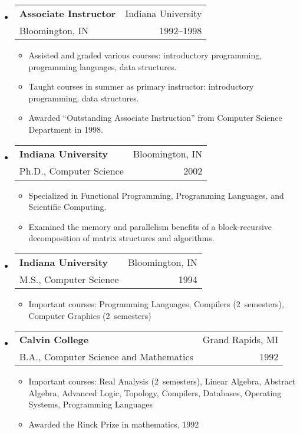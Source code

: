 \documentclass[letterpaper,10pt]{article}
\makeatletter
\newcommand{\resitem}[1]{\item #1 \vspace{-2pt}}
\newcommand{\resheading}[1]{{\large \parashade[.9]{sharpcorners}{\textbf{#1 \vphantom{p\^{E}}}}}}
\newcommand{\ressubheading}[4]{ 
\begin{tabular*}{7in}{l@{\extracolsep{\fill}}r}
	\textbf{#1} & #2 \\
	{#3} & {#4} \\
\end{tabular*}
\vspace{-6pt}}
\makeatother
\begin{document}
\begin{itemize}
	\item \ressubheading{Associate Instructor}{Indiana University}{Bloomington, IN}{1992--1998} 
	\begin{itemize}
		\resitem{Assisted and graded various courses: introductory programming, programming languages, data structures.}
		\resitem{Taught courses in summer as primary instructor: introductory programming, data structures.}
		\resitem{Awarded ``Outstanding Associate Instruction'' from Computer Science Department in 1998.}
	\end{itemize}
\end{itemize}


\resheading{Education} 
\begin{itemize}
	\item \ressubheading{Indiana University}{Bloomington, IN}{Ph.D., Computer Science}{2002} 
	\begin{itemize}
		\resitem{Specialized in Functional Programming, Programming Languages, and Scientific Computing.}
		\resitem{Examined the memory and parallelism benefits of a block-recursive decomposition of matrix structures and algorithms.}
	\end{itemize}
	
	\item \ressubheading{Indiana University}{Bloomington, IN}{M.S., Computer Science}{1994}	
	   \begin{itemize}
	   \resitem{Important courses: Programming Languages, Compilers (2~semesters), Computer Graphics (2~semesters)}
	   \end{itemize}
	
	\item \ressubheading{Calvin College}{Grand Rapids, MI}{B.A., Computer Science and Mathematics}{1992} 
  	\begin{itemize}
	  \resitem{Important courses: Real Analysis (2~semesters), Linear Algebra, Abstract Algebra, Advanced Logic, Topology, Compilers, Databases, Operating Systems, Programming Languages}
		\resitem{Awarded the Rinck Prize in mathematics, 1992} 
	  \end{itemize}
\end{itemize}
\end{document}
